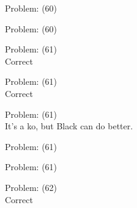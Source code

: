\documentclass[11pt]{article}
\begin{document}
\begin{minipage}[t]{0.5\textwidth}
  {\centering
  
Problem: (60)\\
  }
\end{minipage}
\begin{minipage}[t]{0.5\textwidth}
  {\centering
  
Problem: (60)\\
  }
\end{minipage}
\begin{minipage}[t]{0.5\textwidth}
  {\centering
  
Problem: (61)\\
Correct\\
  }
\end{minipage}
\begin{minipage}[t]{0.5\textwidth}
  {\centering
  
Problem: (61)\\
Correct\\
  }
\end{minipage}
\begin{minipage}[t]{0.5\textwidth}
  {\centering
  
Problem: (61)\\
It's a ko, but Black can do better.\\
  }
\end{minipage}
\begin{minipage}[t]{0.5\textwidth}
  {\centering
  
Problem: (61)\\
  }
\end{minipage}
\begin{minipage}[t]{0.5\textwidth}
  {\centering
  
Problem: (61)\\
  }
\end{minipage}
\begin{minipage}[t]{0.5\textwidth}
  {\centering
  
Problem: (62)\\
Correct\\
  }
\end{minipage}
\end{document}
